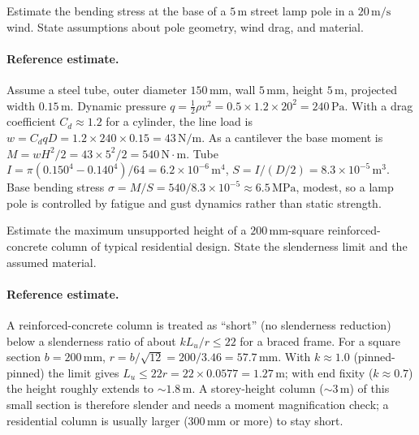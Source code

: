 \begin{exercise}
Estimate the bending stress at the base of a $5\,\si{\meter}$
street lamp pole in a $20\,\si{\meter\per\second}$ wind. State
assumptions about pole geometry, wind drag, and material.

\paragraph{Reference estimate.} Assume a steel tube, outer diameter
$150\,\si{\milli\meter}$, wall $5\,\si{\milli\meter}$, height $5\,\si{
\meter}$, projected width $0.15\,\si{\meter}$. Dynamic pressure $q =
\tfrac12\rho v^2 = 0.5\times 1.2\times 20^2 = 240\,\text{Pa}$. With a
drag coefficient $C_d \approx 1.2$ for a cylinder, the line load is
$w = C_d q D = 1.2\times 240\times 0.15 = 43\,\text{N}/\text{m}$. As a
cantilever the base moment is $M = wH^2/2 = 43\times 5^2/2 = 540\,
\text{N}\cdot\text{m}$. Tube $I = \pi(0.150^4 - 0.140^4)/64 = 6.2
\times 10^{-6}\,\si{\meter\tothe{4}}$, $S = I/(D/2) = 8.3\times 10^{-5}
\,\si{\meter\cubed}$. Base bending stress $\sigma = M/S = 540/8.3
\times 10^{-5} \approx 6.5\,\text{MPa}$, modest, so a lamp pole is
controlled by fatigue and gust dynamics rather than static strength.
\end{exercise}

\begin{exercise}
Estimate the maximum unsupported height of a $200\,\si{\milli
\meter}$-square reinforced-concrete column of typical residential
design. State the slenderness limit and the assumed material.

\paragraph{Reference estimate.} A reinforced-concrete column is
treated as ``short'' (no slenderness reduction) below a slenderness
ratio of about $kL_u/r \leq 22$ for a braced frame. For a square
section $b = 200\,\si{\milli\meter}$, $r = b/\sqrt{12} = 200/3.46 =
57.7\,\si{\milli\meter}$. With $k \approx 1.0$ (pinned-pinned) the
limit gives $L_u \leq 22 r = 22\times 0.0577 = 1.27\,\si{\meter}$;
with end fixity ($k \approx 0.7$) the height roughly extends to
$\sim 1.8\,\si{\meter}$. A storey-height column ($\sim 3\,\si{\meter}$)
of this small section is therefore slender and needs a moment
magnification check; a residential column is usually larger
($300\,\si{\milli\meter}$ or more) to stay short.
\end{exercise}

